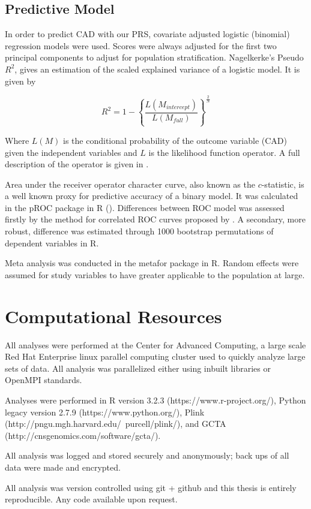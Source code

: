 \subsection{Predictive Model}

In order to predict \ac{CAD} with our \ac{PRS}, covariate adjusted logistic (binomial) regression models were used. Scores were always adjusted for the first two principal components to adjust for population stratification. Nagelkerke's Pseudo $R^2$, gives an estimation of the scaled explained variance of a logistic model. It is given by

$$ R^2 = 1 - \left\{  \frac{L(M_{intercept})}{L(M_{full})}  \right\}^{\frac{2}{N}} $$

Where $L(M)$ is the conditional probability of the outcome variable (\ac{CAD}) given the independent variables and $L$ is the likelihood function operator. A full description of the operator is given in \cite{Nagelkerke1991}.

Area under the receiver operator character curve, also known as the $c$-statistic, is a well known proxy for predictive accuracy of a binary model. It was calculated in the pROC package in R (\cite{Robin2011}). Differences between ROC model was assessed firstly by the method for correlated ROC curves proposed by \cite{DeLong1988}. A secondary, more robust, difference was estimated through 1000 bootstrap permutations of dependent variables in R. 

Meta analysis was conducted in the metafor package in R. \citep{metafor} Random effects were assumed for study variables to have greater applicable to the population at large. 

\section{Computational Resources}

All analyses were performed at the Center for Advanced Computing, a large scale Red Hat Enterprise linux parallel computing cluster used to quickly analyze large sets of data. All analysis was parallelized either using inbuilt libraries or OpenMPI standards. 

Analyses were performed in R version 3.2.3 (https://www.r-project.org/), Python legacy version 2.7.9 (https://www.python.org/), Plink (http://pngu.mgh.harvard.edu/~purcell/plink/), and GCTA (http://cnsgenomics.com/software/gcta/).

All analysis was logged and stored securely and anonymously; back ups of all data were made and encrypted.

All analysis was version controlled using git + github and this thesis is entirely reproducible. Any code available upon request. 

\let\cleardoublepage\clearpage
